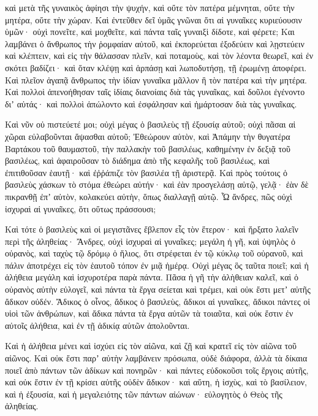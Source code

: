 {καὶ μετὰ τῆς γυναικὸς ἀφίησι τὴν ψυχήν, καὶ οὔτε τὸν πατέρα μέμνηται, οὔτε τὴν μητέρα, οὔτε τὴν χώραν.
Καὶ ἐντεῦθεν δεῖ ὑμᾶς γνῶναι ὅτι αἱ γυναῖκες κυριεύουσιν ὑμῶν· οὐχὶ πονεῖτε, καὶ μοχθεῖτε, καὶ πάντα ταῖς γυναιξὶ δίδοτε, καὶ φέρετε;
Και λαμβάνει ὁ ἄνθρωπος τὴν ῥομφαίαν αὐτοῦ, καὶ ἐκπορεύεται ἐξοδεύειν καὶ λῃστεύειν καὶ κλέπτειν, καὶ εἰς τὴν θάλασσαν πλεῖν, καὶ ποταμοὺς,
καὶ τὸν λέοντα θεωρεῖ, καὶ ἐν σκότει βαδίζει· καὶ ὅταν κλέψῃ καὶ ἁρπάσῃ καὶ λωποδυτήσῃ, τῇ ἐρωμένῃ ἀποφέρει.
Καὶ πλεῖον ἀγαπᾷ ἄνθρωπος τὴν ἰδίαν γυναῖκα μᾶλλον ἢ τὸν πατέρα καὶ τὴν μητέρα.
Καὶ πολλοὶ ἀπενοήθησαν ταῖς ἰδίαις διανοίαις διὰ τὰς γυναῖκας, καὶ δοῦλοι ἐγένοντο διʼ αὐτάς·
καὶ πολλοὶ ἀπώλοντο καὶ ἐσφάλησαν καὶ ἡμάρτοσαν διὰ τὰς γυναῖκας.
\par }{\PP {}Καὶ νῦν οὐ πιστεύετέ μοι; οὐχὶ μέγας ὁ βασιλεὺς τῇ ἐξουσίᾳ αὐτοῦ; οὐχὶ πᾶσαι αἱ χῶραι εὐλαβοῦνται ἅψασθαι αὐτοῦ;
Ἐθεώρουν αὐτὸν, καὶ Ἀπάμην τὴν θυγατέρα Βαρτάκου τοῦ θαυμαστοῦ, τὴν παλλακὴν τοῦ βασιλέως, καθημένην ἐν δεξιᾷ τοῦ βασιλέως,
καὶ ἀφαιροῦσαν τὸ διάδημα ἀπὸ τῆς κεφαλῆς τοῦ βασιλέως, καὶ ἐπιτιθοῦσαν ἑαυτῇ· καὶ ἐῤῥάπιζε τὸν βασιλέα τῇ ἀριστερᾷ.
Καὶ πρὸς τούτοις ὁ βασιλεὺς χάσκων τὸ στόμα ἐθεώρει αὐτήν· καὶ ἐὰν προσγελάσῃ αὐτῷ, γελᾷ· ἐὰν δὲ πικρανθῇ ἐπʼ αὐτὸν, κολακεύει αὐτὴν, ὅπως διαλλαγῇ αὐτῷ.
Ὦ ἄνδρες, πῶς οὐχὶ ἰσχυραὶ αἱ γυναῖκες, ὅτι οὕτως πράσσουσι;
\par }{\PP {}Καὶ τότε ὁ βασιλεὺς καὶ οἱ μεγιστᾶνες ἔβλεπον εἷς τὸν ἕτερον· καὶ ἤρξατο λαλεῖν περὶ τῆς ἀληθείας·
Ἄνδρες, οὐχὶ ἰσχυραὶ αἱ γυναῖκες; μεγάλη ἡ γῆ, καὶ ὑψηλὸς ὁ οὐρανὸς, καὶ ταχὺς τῷ δρόμῳ ὁ ἥλιος, ὅτι στρέφεται ἐν τῷ κύκλῳ τοῦ οὐρανοῦ, καὶ πάλιν ἀποτρέχει εἰς τὸν ἑαυτοῦ τόπον ἐν μιᾷ ἡμέρᾳ.
Οὐχὶ μέγας ὃς ταῦτα ποιεῖ; καὶ ἡ ἀλήθεια μεγάλη καὶ ἰσχυροτέρα παρὰ πάντα.
Πᾶσα ἡ γῆ τὴν ἀλὴθειαν καλεῖ, καὶ ὁ οὐρανὸς αὐτὴν εὐλογεῖ, καὶ πάντα τὰ ἔργα σείεται καὶ τρέμει, καὶ οὐκ ἔστι μετʼ αὐτῆς ἄδικον οὐδέν.
Ἄδικος ὁ οἶνος, ἄδικος ὁ βασιλεὺς, ἄδικοι αἱ γυναῖκες, ἄδικοι πάντες οἱ υἱοὶ τῶν ἀνθρώπων, καὶ ἄδικα πάντα τὰ ἔργα αὐτῶν τὰ τοιαῦτα, καὶ οὐκ ἔστιν ἐν αὐτοῖς ἀλήθεια, καὶ ἐν τῇ ἀδικίᾳ αὐτῶν ἀπολοῦνται.
\par }{\PP {}Καὶ ἡ ἀλήθεια μένει καὶ ἰσχύει εἰς τὸν αἰῶνα, καὶ ζῇ καὶ κρατεῖ εἰς τὸν αἰῶνα τοῦ αἰῶνος.
Καὶ οὐκ ἔστι παρʼ αὐτὴν λαμβάνειν πρόσωπα, οὐδὲ διάφορα, ἀλλὰ τὰ δίκαια ποιεῖ ἀπὸ πάντων τῶν ἀδίκων καὶ πονηρῶν· καὶ πάντες εὐδοκοῦσι τοῖς ἔργοις αὐτῆς,
καὶ οὐκ ἔστιν ἐν τῇ κρίσει αὐτῆς οὐδὲν ἄδικον· καὶ αὕτη, ἡ ἰσχὺς, καὶ τὸ βασίλειον, καὶ ἡ ἐξουσία, καὶ ἡ μεγαλειότης τῶν πάντων αἰώνων· εὐλογητὸς ὁ Θεὸς τῆς ἀληθείας.
}
